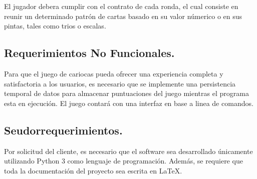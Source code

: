 El jugador debera cumplir con el contrato de cada ronda, 
el cual consiste en reunir un determinado patrón de cartas basado en su valor númerico o en sus pintas, tales como trios o escalas.


\subsection{Requerimientos No Funcionales.}\label{cap:requerimientos-no-funcionales}

Para que el juego de cariocas pueda ofrecer una experiencia completa y
satisfactoria a los usuarios, es necesario que se implemente una persistencia 
temporal de datos para almacenar puntuaciones del juego mientras el programa esta en ejecución. 
El juego contará con una interfaz en base a linea de comandos.


\subsection{Seudorrequerimientos.}\label{cap:seudorrequerimientos}
Por solicitud del cliente, es necesario que el software sea desarrollado únicamente utilizando Python 3 como lenguaje de programación. Además, se requiere que toda la documentación del proyecto sea escrita en LaTeX.
